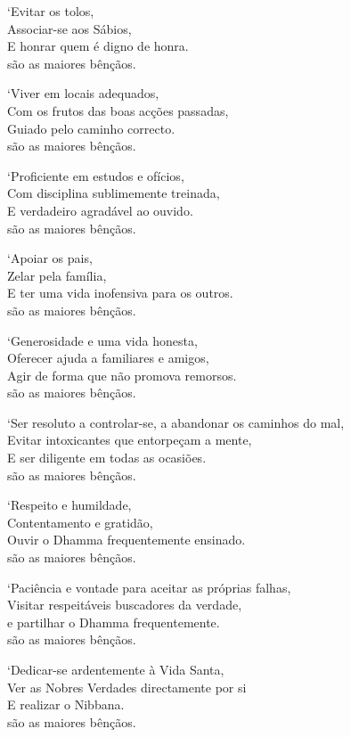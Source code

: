 `Evitar os tolos,\\
Associar-se aos Sábios,\\
E honrar quem é digno de honra.\\
 são as maiores bênçãos.

`Viver em locais adequados,\\
Com os frutos das boas acções passadas,\\
Guiado pelo caminho correcto.\\
 são as maiores bênçãos.

\clearpage

`Proficiente em estudos e ofícios,\\
Com disciplina sublimemente treinada,\\
E  verdadeiro agradável ao ouvido.\\
 são as maiores bênçãos.

`Apoiar os pais,\\
Zelar pela família,\\
E ter uma vida inofensiva para os outros.\\
 são as maiores bênçãos.

`Generosidade e uma vida honesta,\\
Oferecer ajuda a familiares e amigos,\\
Agir de forma que não promova remorsos.\\
 são as maiores bênçãos.

`Ser resoluto a controlar-se, a abandonar os caminhos do mal,\\
Evitar intoxicantes que entorpeçam a mente,\\
E ser diligente em todas as ocasiões.\\
 são as maiores bênçãos.

`Respeito e humildade,\\
Contentamento e gratidão,\\
Ouvir o Dhamma frequentemente ensinado.\\
 são as maiores bênçãos.

`Paciência e vontade para aceitar as próprias falhas,\\
Visitar respeitáveis buscadores da verdade,\\
e partilhar o Dhamma frequentemente.\\
 são as maiores bênçãos.

\clearpage

`Dedicar-se ardentemente à Vida Santa,\\
Ver as Nobres Verdades directamente por si\\
E realizar o Nibbana.\\
 são as maiores bênçãos.

